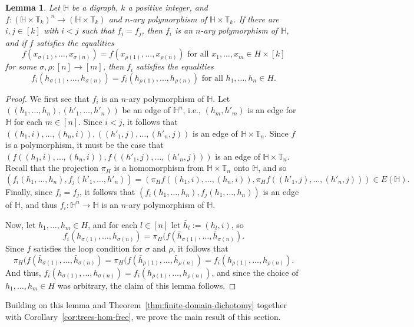 \documentclass{article}
\newtheorem{lemma}[theorem]{Lemma}
\theoremstyle{definition}
\theoremstyle{remark}
\newcommand{\bH}{{\mathbb H}}
\newcommand{\bT}{{\mathbb T}}
\begin{document}
\begin{lemma}\label{lem:HxTk-loop-condition}
    Let $\bH$ be a digraph, $k$ a positive integer, and $f\colon (\bH\times \bT_k)^n\to (\bH\times \bT_k)$
    and $n$-ary polymorphism of $\bH\times \bT_k$. If there are $i,j\in [k]$ with $i < j$ such that
    $f_i = f_j$, then $f_i$ is an $n$-ary polymorphism of $\bH$, and if $f$ satisfies the equalities
    \[
        f(x_{\sigma(1)},\dots, x_{\sigma(n)}) = f(x_{\rho(1)},\dots, x_{\rho(n)}) \text{ for all } x_1,\dots, x_m\in H\times [k]
    \]
    for some $\sigma,\rho\colon[n]\to [m]$, then $f_i$ satisfies the equalities  
    \[
    f_i(h_{\sigma(1)},\dots, h_{\sigma(n)}) = f_i(h_{\rho(1)},\dots, h_{\rho(n)}) \text{ for all } h_1,\dots, h_n\in H.
    \]
\end{lemma}
\begin{proof}
    We first see that $f_i$ is an $n$-ary polymorphism of $\bH$. Let $((h_1,\dots, h_n),(h'_1,\dots, h'_n))$
    be an edge of $\bH^n$, i.e., $(h_m,h'_m)$ is an edge for $\bH$ for each $m\in [n]$. Since $i < j$, it follows
    that $((h_1,i),\dots, (h_n,i)),((h'_1,j),\dots, (h'_n,j))$ is an edge of $\bH\times \bT_n$. Since $f$ is a
    polymorphism, it must be the case that $(f((h_1,i),\dots, (h_n,i)),f((h'_1,j),\dots, (h'_n,j)))$ is an edge
    of $\bH\times \bT_n$. Recall that the projection $\pi_H$ is a homomorphism from $\bH\times \bT_n$ onto $\bH$,
    and so
    \[
    (f_i(h_1,\dots, h_n),f_j(h'_1,\dots, h'_n)) = (\pi_Hf((h_1,i),\dots, (h_n,i)),\pi_Hf((h'_1,j),\dots, (h'_n,j))) \in E(\bH).
    \]
    Finally, since $f_i = f_j$, it follows that $(f_i(h_1,\dots, h_n),f_j(h_1,\dots, h_n))$ is an edge
    of $\bH$, and thus $f_i\colon \bH^n\to \bH$ is an $n$-ary polymorphism of $\bH$.

    Now, let $h_1,\dots, h_m\in H$, and for each $l\in[n]$ let $\bar{h}_l := (h_l,i)$, so
    \[
    f_i(h_{\sigma(1)},\dots, h_{\sigma(n)}) = \pi_H(f(\bar{h}_{\sigma(1)},\dots, \bar{h}_{\sigma(n)}).
    \]
    Since $f$ satisfies the loop condition for $\sigma$ and $\rho$, it follows that
    \[
    \pi_H(f(\bar{h}_{\sigma(1)},\dots, \bar{h}_{\sigma(n)}) = \pi_H(f(\bar{h}_{\rho(1)},\dots, \bar{h}_{\rho(n)})
    = f_i(h_{\rho(1)},\dots, h_{\rho(n)}).
    \]
    And thus, $f_i(h_{\sigma(1)},\dots, h_{\sigma(n)}) = f_i(h_{\rho(1)},\dots, h_{\rho(n)})$, and since the
    choice  of $h_1,\dots, h_m\in H$ was arbitrary, the claim of this lemma follows.
\end{proof}

Building on this lemma and Theorem~\ref{thm:finite-domain-dichotomy} together with
Corollary~\ref{cor:trees-hom-free}, we prove the main result of this section.
\end{document}
